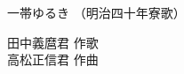 \documentclass[10pt,b5j]{tarticle} %
\begin{document}
\begin{minipage}[c]{0.7\hsize} %
    \begin{center}
        {\LARGE
            一帯ゆるき %
        }
        {\small 
            （明治四十年寮歌） %
        }
    \end{center}
\end{minipage}
\begin{minipage}[c]{0.3\hsize} %
    \begin{flushright} %
        田中義麿君 作歌\\高松正信君 作曲 %
    \end{flushright}
\end{minipage}
\end{document}
